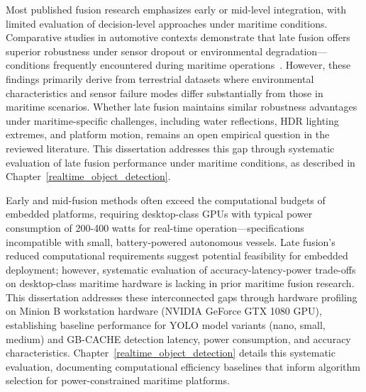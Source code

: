 \documentclass[../main.tex]{subfiles}
\begin{document}
Most published fusion research emphasizes early or mid-level integration, with limited evaluation of decision-level approaches under maritime conditions.
Comparative studies in automotive contexts demonstrate that late fusion offers superior robustness under sensor dropout or environmental degradation---conditions frequently encountered during maritime operations~\cite{huang2024, wang2020a}.
However, these findings primarily derive from terrestrial datasets where environmental characteristics and sensor failure modes differ substantially from those in maritime scenarios.
Whether late fusion maintains similar robustness advantages under maritime-specific challenges, including water reflections, HDR lighting extremes, and platform motion, remains an open empirical question in the reviewed literature.
This dissertation addresses this gap through systematic evaluation of late fusion performance under maritime conditions, as described in Chapter~\ref{realtime_object_detection}.


Early and mid-fusion methods often exceed the computational budgets of embedded platforms, requiring desktop-class GPUs with typical power consumption of 200-400 watts for real-time operation---specifications incompatible with small, battery-powered autonomous vessels.
Late fusion's reduced computational requirements suggest potential feasibility for embedded deployment; however, systematic evaluation of accuracy-latency-power trade-offs on desktop-class maritime hardware is lacking in prior maritime fusion research.
This dissertation addresses these interconnected gaps through hardware profiling on Minion B workstation hardware (NVIDIA GeForce GTX 1080 GPU), establishing baseline performance for YOLO model variants (nano, small, medium) and GB-CACHE detection latency, power consumption, and accuracy characteristics.
Chapter~\ref{realtime_object_detection} details this systematic evaluation, documenting computational efficiency baselines that inform algorithm selection for power-constrained maritime platforms.
\end{document}
